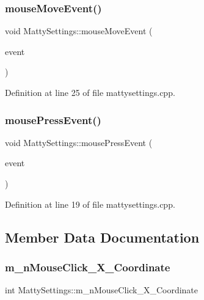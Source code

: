 \subsubsection{\texorpdfstring{mouse\+Move\+Event()}{mouseMoveEvent()}}
{\footnotesize\ttfamily void Matty\+Settings\+::mouse\+Move\+Event (\begin{DoxyParamCaption}\item[{Q\+Mouse\+Event $\ast$}]{event }\end{DoxyParamCaption})\hspace{0.3cm}{\ttfamily [private]}}



Definition at line 25 of file mattysettings.\+cpp.

\hypertarget{classMattySettings_aedf4cc84f37e25a7704e1ced6c18df95}{}\label{classMattySettings_aedf4cc84f37e25a7704e1ced6c18df95} 
\subsubsection{\texorpdfstring{mouse\+Press\+Event()}{mousePressEvent()}}
{\footnotesize\ttfamily void Matty\+Settings\+::mouse\+Press\+Event (\begin{DoxyParamCaption}\item[{Q\+Mouse\+Event $\ast$}]{event }\end{DoxyParamCaption})\hspace{0.3cm}{\ttfamily [private]}}



Definition at line 19 of file mattysettings.\+cpp.



\subsection{Member Data Documentation}
\hypertarget{classMattySettings_aa1c8051298eee4d2e77a93af3ddeb9d0}{}\label{classMattySettings_aa1c8051298eee4d2e77a93af3ddeb9d0} 
\subsubsection{\texorpdfstring{m\+\_\+n\+Mouse\+Click\+\_\+\+X\+\_\+\+Coordinate}{m\_nMouseClick\_X\_Coordinate}}
{\footnotesize\ttfamily int Matty\+Settings\+::m\+\_\+n\+Mouse\+Click\+\_\+\+X\+\_\+\+Coordinate\hspace{0.3cm}{\ttfamily [private]}}



